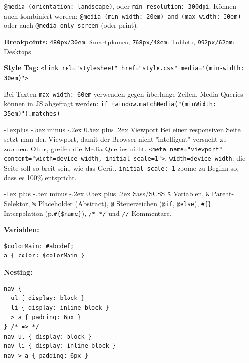 \documentclass[a4paper, fontsize=6pt]{scrartcl}
\makeatletter
\renewcommand{\section}{\@startsection{section}{1}{0mm}%
    {-1ex plus -.5ex minus -.2ex}%
    {0.5ex plus .2ex}%
    {\normalfont\large\bfseries}}
\renewcommand{\subsection}{\@startsection{subsection}{2}{0mm}%
    {-1explus -.5ex minus -.2ex}%
    {0.5ex plus .2ex}%
    {\normalfont\normalsize\bfseries}}
\newcommand{\css}[1]{\texttt{#1}}
\newcommand{\scss}[1]{\texttt{#1}} %
\newcommand{\html}[1]{\texttt{#1}}
\newcommand{\js}[1]{\texttt{#1}}
\makeatother
\begin{document}
\begin{multicols*}{5}
\css{@media (orientation: landscape)}, oder \css{min-resolution: 300dpi}. Können auch kombiniert werden: \css{@media (min-width: 20em) and (max-width: 30em)} oder auch \css{@media only screen} (oder print).

\textbf{Breakpoints:} \css{480px/30em}: Smartphones, \css{768px/48em}: Tablets, \css{992px/62em}: Desktops

\textbf{Style Tag:} \html{<link rel="stylesheet" href="style.css" media="(min-width: 30em)">}

Bei Texten \css{max-width: 60em} verwenden gegen überlange Zeilen. Media-Queries können in JS abgefragt werden: \js{if (window.matchMedia("(minWidth: 35em)").matches)}

\subsection{Viewport}
Bei einer responsiven Seite setzt man den Viewport, damit der Browser nicht "intelligent" versucht zu zoomen. Ohne, greifen die Media Queries nicht. \html{<meta name="viewport" content="width=device-width, initial-scale=1">}. \html{width=device-width}: die Seite soll so breit sein, wie das Gerät. \html{initial-scale: 1} zoome zu Beginn so, dass es 100\% entspricht.

\section{Sass/SCSS}
\verb|$| Variablen,
\verb|&| Parent-Selektor, 
\verb|%| Placeholder (Abstract), 
\verb|@| Steuerzeichen (\scss{@if}, \scss{@else}), 
\verb|#{}| Interpolation (p.\verb|#{$name}|),
\scss{/* */} und \scss{//} Kommentare.

\textbf{Variablen:}
\begin{verbatim}
$colorMain: #abcdef;
a { color: $colorMain }
\end{verbatim}

\textbf{Nesting:}
\begin{verbatim}
nav {
  ul { display: block }
  li { display: inline-block }
  > a { padding: 6px }
} /* => */
nav ul { display: block }
nav li { display: inline-block }
nav > a { padding: 6px }
\end{verbatim}


\end{multicols*}
\end{document}
